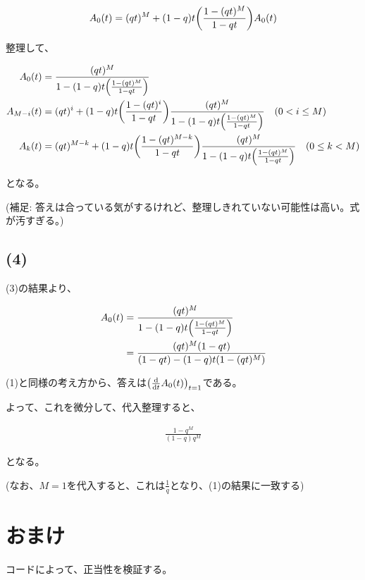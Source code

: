 \documentclass[a4paper, 10pt, dvipdfmx]{jlreq}
\begin{document}
\begin{align*}
    A_0(t)  = (qt)^M+(1-q)t\qty(\frac{1-(qt)^M}{1-qt})A_0(t) \\
\end{align*}

整理して、

\begin{align*}
    A_0(t)     & =\frac{(qt)^M}{1-(1-q)t\qty(\frac{1-(qt)^M}{1-qt})}                                                                      \\
    A_{M-i}(t) & =(qt)^i+(1-q)t\qty(\frac{1-(qt)^i}{1-qt})\frac{(qt)^M}{1-(1-q)t\qty(\frac{1-(qt)^M}{1-qt})} \quad (0 < i \leq M)         \\
    A_{k}(t)   & =(qt)^{M-k}+(1-q)t\qty(\frac{1-(qt)^{M-k}}{1-qt})\frac{(qt)^M}{1-(1-q)t\qty(\frac{1-(qt)^M}{1-qt})} \quad (0 \leq k < M) \\
\end{align*}

となる。

(補足: 答えは合っている気がするけれど、整理しきれていない可能性は高い。式が汚すぎる。)

\subsection*{(4)}

(3)の結果より、

\begin{align*}
    A_0(t) & =\frac{(qt)^M}{1-(1-q)t\qty(\frac{1-(qt)^M}{1-qt})} \\
           & =\frac{(qt)^M(1-qt)}{(1-qt)-(1-q)t(1-(qt)^M)}       \\
\end{align*}


(1)と同様の考え方から、答えは$\qty(\dv{t}A_0(t))_{t=1}$である。

よって、これを微分して、代入整理すると、

\begin{align*}
    \frac{1-q^M}{(1-q)q^M}
\end{align*}

となる。

(なお、$M=1$を代入すると、これは$\frac{1}{q}$となり、(1)の結果に一致する)

\section{おまけ}

コードによって、正当性を検証する。
\end{document}
